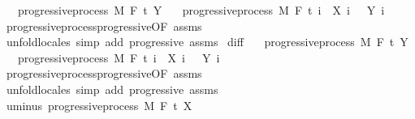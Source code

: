 \begin{isabellebody}
\ \ \ {\isachardoublequoteopen}progressive{\isacharunderscore}{\kern0pt}process\ M\ F\ t\ Y{\isachardoublequoteclose}\isanewline
\ \ \ {\isachardoublequoteopen}progressive{\isacharunderscore}{\kern0pt}process\ M\ F\ t\ {\isacharparenleft}{\kern0pt}{\isasymlambda}i\ {\isasymxi}{\isachardot}{\kern0pt}\ X\ i\ {\isasymxi}\ {\isacharplus}{\kern0pt}\ Y\ i\ {\isasymxi}{\isacharparenright}{\kern0pt}{\isachardoublequoteclose}\isanewline
%
\isadelimproof
\ \ %
\endisadelimproof
%
\isatagproof
{}\isamarkupfalse%
\ progressive{\isacharunderscore}{\kern0pt}process{\isachardot}{\kern0pt}progressive{\isacharbrackleft}{\kern0pt}OF\ assms{\isacharbrackright}{\kern0pt}\ \isamarkupfalse%
\ {\isacharparenleft}{\kern0pt}unfold{\isacharunderscore}{\kern0pt}locales{\isacharparenright}{\kern0pt}\ {\isacharparenleft}{\kern0pt}simp\ add{\isacharcolon}{\kern0pt}\ progressive\ assms{\isacharparenright}{\kern0pt}%
\endisatagproof
{\isafoldproof}%
%
\isadelimproof
\isanewline
%
\endisadelimproof
\isanewline
{}\isamarkupfalse%
\ diff{\isacharcolon}{\kern0pt}\isanewline
\ \ \ {\isachardoublequoteopen}progressive{\isacharunderscore}{\kern0pt}process\ M\ F\ t\ Y{\isachardoublequoteclose}\isanewline
\ \ \ {\isachardoublequoteopen}progressive{\isacharunderscore}{\kern0pt}process\ M\ F\ t\ {\isacharparenleft}{\kern0pt}{\isasymlambda}i\ {\isasymxi}{\isachardot}{\kern0pt}\ X\ i\ {\isasymxi}\ {\isacharminus}{\kern0pt}\ Y\ i\ {\isasymxi}{\isacharparenright}{\kern0pt}{\isachardoublequoteclose}\isanewline
%
\isadelimproof
\ \ %
\endisadelimproof
%
\isatagproof
{}\isamarkupfalse%
\ progressive{\isacharunderscore}{\kern0pt}process{\isachardot}{\kern0pt}progressive{\isacharbrackleft}{\kern0pt}OF\ assms{\isacharbrackright}{\kern0pt}\ \isamarkupfalse%
\ {\isacharparenleft}{\kern0pt}unfold{\isacharunderscore}{\kern0pt}locales{\isacharparenright}{\kern0pt}\ {\isacharparenleft}{\kern0pt}simp\ add{\isacharcolon}{\kern0pt}\ progressive\ assms{\isacharparenright}{\kern0pt}%
\endisatagproof
{\isafoldproof}%
%
\isadelimproof
\isanewline
%
\endisadelimproof
\isanewline
{}\isamarkupfalse%
\ uminus{\isacharcolon}{\kern0pt}\ {\isachardoublequoteopen}progressive{\isacharunderscore}{\kern0pt}process\ M\ F\ t\ {\isacharparenleft}{\kern0pt}{\isacharminus}{\kern0pt}X{\isacharparenright}{\kern0pt}{\isachardoublequoteclose}%

\end{isabellebody}
